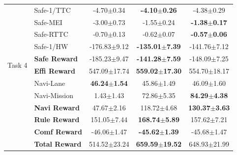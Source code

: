 {\begin{longtable}{l l c c c}
  \multirow{10}{*}{Task 4}
  & Safe-1/TTC       & -4.70$\pm$0.34 & \textbf{-4.10$\pm$0.26} & -4.38$\pm$0.29 \\
  & Safe-MEI         & -3.00$\pm$0.73 & -1.55$\pm$0.24 & \textbf{-1.38$\pm$0.17} \\
  & Safe-RTTC        & -0.70$\pm$0.13 & -0.62$\pm$0.07 & \textbf{-0.57$\pm$0.06} \\
  & Safe-1/HW        & -176.83$\pm$9.12 & \textbf{-135.01$\pm$7.39} & -141.76$\pm$7.12 \\
  & \textbf{Safe Reward} & -185.23$\pm$9.47 & \textbf{-141.28$\pm$7.59} & -148.09$\pm$7.25 \\
  & \textbf{Effi Reward} & 547.09$\pm$17.74 & \textbf{559.02$\pm$17.30} & 554.70$\pm$18.17 \\
  & Navi-Lane        & \textbf{46.24$\pm$1.54} & 45.86$\pm$1.49 & 46.09$\pm$1.60 \\
  & Navi-Mission     & 1.43$\pm$1.43 & 72.86$\pm$5.35 & \textbf{84.29$\pm$4.38} \\
  & \textbf{Navi Reward} & 47.67$\pm$2.16 & 118.72$\pm$4.68 & \textbf{130.37$\pm$3.63} \\
  & \textbf{Rule Reward} & 151.05$\pm$7.44 & \textbf{168.74$\pm$5.89} & 157.62$\pm$7.21 \\
  & \textbf{Comf Reward} & -46.06$\pm$1.47 & \textbf{-45.62$\pm$1.39} & -45.68$\pm$1.47 \\
  & \textbf{Total Reward} & 514.52$\pm$23.24 & \textbf{659.59$\pm$19.52} & 648.93$\pm$21.99 \\

  \end{longtable}
  }%




